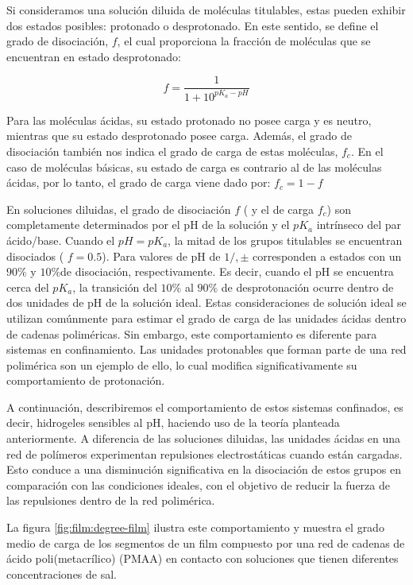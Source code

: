 Si consideramos una soluci\'on diluida de mol\'eculas titulables, estas pueden exhibir dos estados posibles: protonado o desprotonado. En este sentido, se define el grado de disociaci\'on, $f$, el cual proporciona la fracci\'on de mol\'eculas que se encuentran en estado desprotonado:

\begin{equation}
	f = \frac{1}{1+10^{pK_a -pH}}
	\label{eq:film:diso-ideal}
\end{equation}

Para las mol\'eculas \'acidas, su estado protonado no posee carga y es neutro, mientras que su estado desprotonado posee carga. Adem\'as, el grado de disociaci\'on tambi\'en nos indica el grado de carga de estas mol\'eculas, $f_c$. 
En el caso de mol\'eculas b\'asicas, su estado de carga es contrario al de las mol\'eculas \'acidas, por lo tanto, el grado de carga viene dado por: $f_c = 1 -f$


En soluciones diluidas, el grado de disociaci\'on $f$ ( y el de carga $f_c$) son completamente determinados por el pH de la soluci\'on y el $pK_a$ intr\'inseco del par \'acido/base. Cuando el $pH = pK_a$, la mitad de los grupos titulables se encuentran disociados ( $f = 0.5$).  Para valores de pH de $1/,\pm$ corresponden a estados con un $90\%$ y $10\%$de disociaci\'on, respectivamente. Es decir, cuando el pH se encuentra cerca del $pK_a$, la transici\'on del $10\%$ al $90\%$ de desprotonaci\'on ocurre dentro de dos unidades de pH de la soluci\'on ideal.
Estas consideraciones de soluci\'on ideal se utilizan com\'unmente para estimar el grado de carga de las unidades \'acidas dentro de cadenas polim\'ericas. Sin embargo, este comportamiento es diferente para sistemas en confinamiento. Las unidades protonables que forman parte de una red polim\'erica son un ejemplo de ello, lo cual modifica significativamente su comportamiento de protonaci\'on.


A continuaci\'on, describiremos el comportamiento de estos sistemas confinados, es decir, hidrogeles sensibles al pH, haciendo uso de la teor\'ia planteada anteriormente.
A diferencia de las soluciones diluidas, las unidades \'acidas en una red de pol\'imeros experimentan repulsiones electrost\'aticas cuando est\'an cargadas. Esto conduce a una disminuci\'on significativa en la disociaci\'on de estos grupos en comparaci\'on con las condiciones ideales, con el objetivo de reducir la fuerza de las repulsiones dentro de la red polim\'erica.

La figura \ref{fig:film:degree-film} ilustra este comportamiento y muestra el grado medio de carga de los segmentos de un film compuesto por una red de cadenas de \'acido poli(metacrílico) (PMAA) en contacto con soluciones que tienen diferentes concentraciones de sal.




